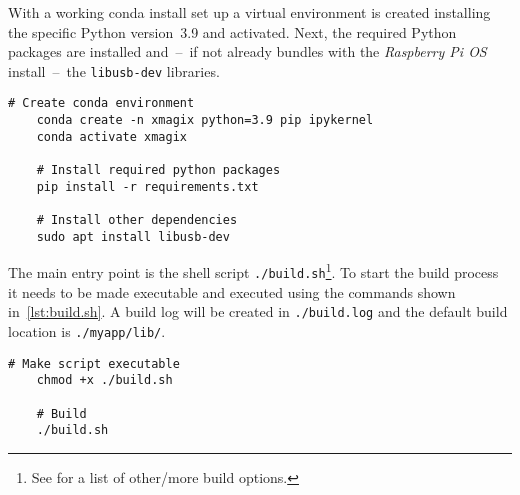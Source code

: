            With a working conda install set up a virtual environment is created installing the specific Python version~\num{3.9} and activated.
            Next, the required Python packages are installed and~--~if not already bundles with the \textit{Raspberry Pi OS} install~--~the \texttt{libusb-dev} libraries.
            \begin{lstlisting}[style=mybash, caption={[Creating conda environment and installing dependencies]Creating conda environment and installing dependencies.}, label={lst:creating conda env}]
    # Create conda environment
    conda create -n xmagix python=3.9 pip ipykernel
    conda activate xmagix

    # Install required python packages
    pip install -r requirements.txt

    # Install other dependencies
    sudo apt install libusb-dev
            \end{lstlisting}

            The main entry point is the shell script \texttt{./build.sh}\footnote{See \cite{Software.XraythesisHandel.2023} for a list of other/more build options.}.
            To start the build process it needs to be made executable and executed using the commands shown in~\cref{lst:build.sh}.
            A build log will be created in \texttt{./build.log} and the default build location is \texttt{./myapp/lib/}.
            \begin{lstlisting}[style=mybash, caption={[Executing build script]Executing build script.}, label={lst:build.sh}]
    # Make script executable
    chmod +x ./build.sh

    # Build
    ./build.sh
            \end{lstlisting}
